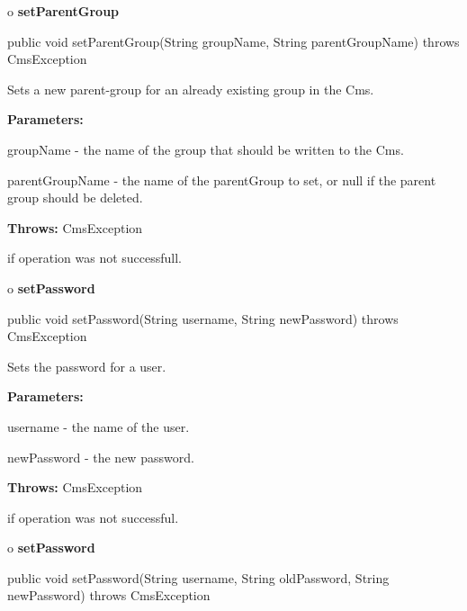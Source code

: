 o {\bf setParentGroup} 

\begin{PRE}
 public void setParentGroup(String groupName,
                            String parentGroupName) throws CmsException
\end{PRE}

\begin{description}
\htmlDD Sets a new parent-group for an already existing group in the Cms. 

\begin{description}
\item {\bf Parameters:}  

groupName - the name of the group that should be written to the Cms.  

parentGroupName - the name of the parentGroup to set, or null if the parent
group should be deleted.  
\item {\bf Throws:} CmsException  

if operation was not successfull.  
\end{description}

\end{description}

o {\bf setPassword} 

\begin{PRE}
 public void setPassword(String username,
                         String newPassword) throws CmsException
\end{PRE}

\begin{description}
\htmlDD Sets the password for a user. 

\begin{description}
\item {\bf Parameters:}  

username - the name of the user.  

newPassword - the new password.  
\item {\bf Throws:} CmsException  

if operation was not successful.  
\end{description}

\end{description}

o {\bf setPassword} 

\begin{PRE}
 public void setPassword(String username,
                         String oldPassword,
                         String newPassword) throws CmsException
\end{PRE}

